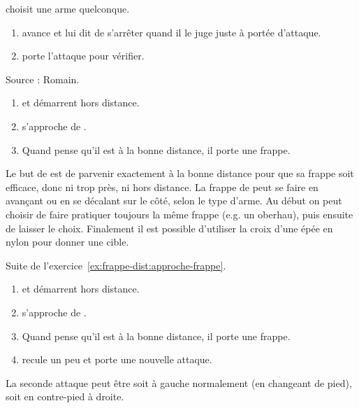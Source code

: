 \begin{exercice}
\A choisit une arme quelconque.

\begin{enumerate}
	\item \D avance et \A lui dit de s'arrêter quand il le juge juste à portée d'attaque.
	
	\item \A porte l'attaque pour vérifier.
\end{enumerate}

Source : Romain.

\end{exercice}


\begin{exercice}
\label{ex:frappe-dist:approche-frappe}

\begin{enumerate}
	\item \A et \D démarrent hors distance.
	\item \D s'approche de \A.
	\item Quand \A pense qu'il est à la bonne distance, il porte une frappe.
\end{enumerate}

Le but de \A est de parvenir exactement à la bonne distance pour que sa frappe soit efficace, donc ni trop près, ni hors distance.
La frappe de \A peut se faire en avançant ou en se décalant sur le côté, selon le type d'arme.
Au début on peut choisir de faire pratiquer toujours la même frappe (e.g.
un oberhau), puis ensuite de laisser le choix.
Finalement il est possible d'utiliser la croix d'une épée en nylon pour donner une cible.

\end{exercice}


\begin{exercice}
\label{ex:frappe-dist:approche-double-frappe}

Suite de l'exercice~\ref{ex:frappe-dist:approche-frappe}.

\begin{enumerate}
	\item \A et \D démarrent hors distance.
	\item \D s'approche de \A.
	\item Quand \A pense qu'il est à la bonne distance, il porte une frappe.
	\item \D recule un peu et \A porte une nouvelle attaque.
\end{enumerate}

La seconde attaque peut être soit à gauche normalement (en changeant de pied), soit en contre-pied à droite.
\end{exercice}


